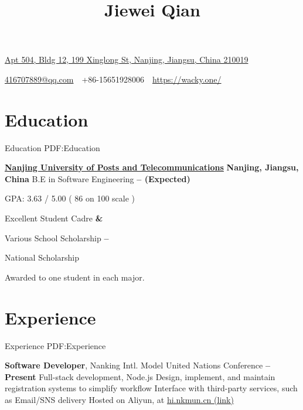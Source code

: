 \documentclass[a4paper,MMMyyyy,nonstop]{simpleresumecv}
\newcommand{\CVAuthor}{Jiewei Qian}
\newcommand{\CVWebpage}{https://wacky.one/}
\begin{document}
\thispagestyle{empty}


\title{\CVAuthor}

\begin{subtitle}
\href{https://www.google.com/maps/place/504,+199+Xing+Long+Da+Jie,+Jianye+Qu,+Nanjing+Shi,+Jiangsu+Sheng,+China,+210019/}
{Apt 504, Bldg 12, 199 Xinglong St, Nanjing, Jiangsu, China 210019}
\par
\href{mailto:416707889@qq.com}
{416707889@qq.com}
\,\SubBulletSymbol\,
+86-15651928006
\,\SubBulletSymbol\,
\href{\CVWebpage}
{\CVWebpage}
\end{subtitle}

\begin{body}


\section
{Education}
{Education}
{PDF:Education}

\href{http://www.njupt.edu.cn/}
{\textbf{Nanjing University of Posts and Telecommunications}}
\hfill \textbf{ Nanjing, Jiangsu, China }
\BulletItem
B.E in Software Engineering
\hfill
\textbf{
     --
     (Expected)
}

\BulletItem
GPA: 3.63 / 5.00 ( 86 on 100 scale )

\BulletItem
Excellent Student Cadre
\hfill
\textbf{
     \& 
}

\BulletItem
Various School Scholarship
\hfill
\textbf{
     --  
}

\BulletItem
National Scholarship
\hfill
\textbf{
}
\begin{detail}
\SubItem
Awarded to one student in each major.
\end{detail}


\section
{Experience}
{Experience}
{PDF:Experience}

\textbf{Software Developer}, Nanking Intl. Model United Nations Conference
\hfill \textbf{
      -- Present
}
\BulletItem
Full-stack development, Node.js
\BulletItem
Design, implement, and maintain registration systems to simplify workflow
\BulletItem
Interface with third-party services, such as Email/SNS delivery
\BulletItem
Hosted on Aliyun, at \href{https://hi.nkmun.cn/}{hi.nkmun.cn (link)}


\end{body}
\end{document}
